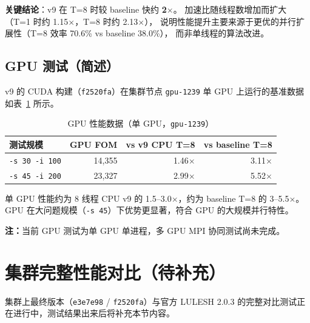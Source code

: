\documentclass[UTF8,12pt,a4paper]{ctexart}
\begin{document}
\textbf{关键结论}：v9 在 T=8 时较 baseline 快约 \textbf{2$\times$}。
加速比随线程数增加而扩大（T=1 时约 1.15$\times$，T=8 时约 2.13$\times$），
说明性能提升主要来源于更优的并行扩展性（T=8 效率 70.6\% vs baseline 38.0\%），
而非单线程的算法改进。

\subsection{GPU 测试（简述）}

v9 的 CUDA 构建（\texttt{f2520fa}）在集群节点 \texttt{gpu-1239} 单 GPU 上运行的基准数据
如表~\ref{tab:gpu} 所示。

\begin{table}[H]
\centering
\caption{GPU 性能数据（单 GPU，\texttt{gpu-1239}）}
\label{tab:gpu}
\begin{tabular}{lrrr}
\toprule
\textbf{测试规模} & \textbf{GPU FOM} & \textbf{vs v9 CPU T=8} & \textbf{vs baseline T=8} \\
\midrule
\texttt{-s 30 -i 100} & 14,355 & 1.46$\times$ & 3.11$\times$ \\
\texttt{-s 45 -i 200} & 23,327 & 2.99$\times$ & 5.52$\times$ \\
\bottomrule
\end{tabular}
\end{table}

单 GPU 性能约为 8 线程 CPU v9 的 1.5--3.0$\times$，约为 baseline T=8 的 3--5.5$\times$。
GPU 在大问题规模（\texttt{-s 45}）下优势更显著，符合 GPU 的大规模并行特性。

\begin{tcolorbox}[
  colback=gray!5, colframe=gray!45,
  fontupper=\small, left=4pt, right=4pt, top=3pt, bottom=3pt]
  \textbf{注：}当前 GPU 测试为单 GPU 单进程，多 GPU MPI 协同测试尚未完成。
\end{tcolorbox}

\section{集群完整性能对比（待补充）}

\begin{tcolorbox}[
  colback=warnbg, colframe=warnyellow,
  fontupper=\small, left=6pt, right=6pt, top=5pt, bottom=5pt,
  title={\textbf{本节结果尚未可用}}]
集群上最终版本（\texttt{e3e7e98} / \texttt{f2520fa}）与官方 LULESH 2.0.3
的完整对比测试正在进行中，测试结果出来后将补充本节内容。
\end{tcolorbox}
\end{document}
